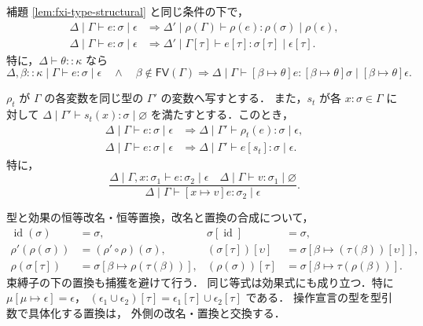\begin{lemma}
\label{lem:fxi-typing-type-substitution}
補題 \ref{lem:fxi-type-structural} と同じ条件の下で，
\begin{align*}
  \Delta\mid\Gamma\vdash e:\sigma\mid\epsilon
  &\Longrightarrow
    \Delta'\mid\rho(\Gamma)\vdash
      \rho(e):\rho(\sigma)\mid\rho(\epsilon),\\
  \Delta\mid\Gamma\vdash e:\sigma\mid\epsilon
  &\Longrightarrow
    \Delta'\mid\Gamma[\tau]\vdash
      e[\tau]:\sigma[\tau]\mid\epsilon[\tau].
\end{align*}
特に，$\Delta\vdash\theta::\kappa$ なら
\[
  \Delta,\beta::\kappa\mid\Gamma
    \vdash e:\sigma\mid\epsilon
  \quad\land\quad
  \beta\notin\mathsf{FV}(\Gamma)
  \Longrightarrow
  \Delta\mid\Gamma\vdash
    [\beta\mapsto\theta]e:
    [\beta\mapsto\theta]\sigma\mid
      [\beta\mapsto\theta]\epsilon.
\]
\end{lemma}

\begin{lemma}[項変数の改名と置換]
\label{lem:fxi-term-substitution}
$\rho_t$ が $\Gamma$ の各変数を同じ型の $\Gamma'$ の変数へ写すとする．
また，$s_t$ が各 $x:\sigma\in\Gamma$ に対して
$\Delta\mid\Gamma'\vdash s_t(x):\sigma\mid\varnothing$
を満たすとする．このとき，
\begin{align*}
  \Delta\mid\Gamma\vdash e:\sigma\mid\epsilon
  &\Longrightarrow
    \Delta\mid\Gamma'\vdash\rho_t(e):\sigma\mid\epsilon,\\
  \Delta\mid\Gamma\vdash e:\sigma\mid\epsilon
  &\Longrightarrow
    \Delta\mid\Gamma'\vdash e[s_t]:\sigma\mid\epsilon.
\end{align*}
特に，
\[
  \frac{\Delta\mid\Gamma,x:\sigma_1
            \vdash e:\sigma_2\mid\epsilon
        \quad
        \Delta\mid\Gamma\vdash v:\sigma_1\mid\varnothing}
       {\Delta\mid\Gamma\vdash
          [x\mapsto v]e:\sigma_2\mid\epsilon}.
\]
\end{lemma}

\begin{proposition}[置換に関する補助等式]
\label{prop:fxi-substitution-equations}
型と効果の恒等改名・恒等置換，改名と置換の合成について，
\begin{align*}
  \operatorname{id}(\sigma)&=\sigma,
  &\sigma[\operatorname{id}]&=\sigma,\\
  \rho'(\rho(\sigma))
    &=(\rho'\circ\rho)(\sigma),
  &(\sigma[\tau])[\upsilon]
    &=\sigma[\beta\mapsto(\tau(\beta))[\upsilon]],\\
  \rho(\sigma[\tau])
    &=\sigma[\beta\mapsto\rho(\tau(\beta))],
  &(\rho(\sigma))[\tau]
    &=\sigma[\beta\mapsto\tau(\rho(\beta))].
\end{align*}
束縛子の下の置換も捕獲を避けて行う．
同じ等式は効果式にも成り立つ．特に
$\mu[\mu\mapsto\epsilon]=\epsilon$，
$(\epsilon_1\cup\epsilon_2)[\tau]
 =\epsilon_1[\tau]\cup\epsilon_2[\tau]$ である．
操作宣言の型を型引数で具体化する置換は，
外側の改名・置換と交換する．
\end{proposition}

